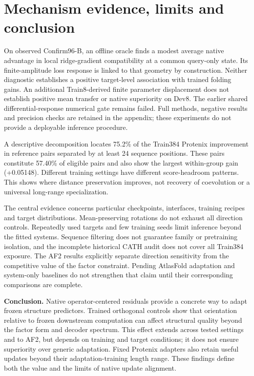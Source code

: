 \section{Mechanism evidence, limits and conclusion}
\label{sec:7}
On observed Confirm96-B, an offline oracle finds a modest average native
advantage in local ridge-gradient compatibility at a common query-only state.
Its finite-amplitude loss response is linked to that geometry by construction.
Neither diagnostic establishes a positive target-level association with trained
folding gains. An additional Train8-derived finite parameter displacement does
not establish positive mean transfer or native superiority on Dev8. The earlier
shared differential-response numerical gate remains failed. Full methods,
negative results and precision checks are retained in the appendix; these
experiments do not provide a deployable inference procedure.

A descriptive decomposition locates 75.2\% of the Train384 Protenix improvement
in reference pairs separated by at least 24 sequence positions. These pairs
constitute 57.40\% of eligible pairs and also show the largest within-group gain
(+0.05148). Different training settings have different score-headroom patterns.
This shows where distance preservation improves, not recovery of coevolution
or a universal long-range specialization.

The central evidence concerns particular checkpoints, interfaces, training
recipes and target distributions. Mean-preserving rotations do not exhaust
all direction controls. Repeatedly used targets and few training seeds limit
inference beyond the fitted systems. Sequence filtering does not guarantee
family or pretraining isolation, and the incomplete historical CATH audit does
not cover all Train384 exposure. The AF2 results explicitly separate direction
sensitivity from the competitive value of the factor constraint. Pending
AtlasFold adaptation and system-only baselines do not strengthen that claim
until their corresponding comparisons are complete.

\textbf{Conclusion.} Native operator-centered residuals provide a concrete way to
adapt frozen structure predictors. Trained orthogonal controls show that
orientation relative to frozen downstream computation can affect structural
quality beyond the factor form and decoder spectrum. This effect extends
across tested settings and to AF2, but depends on training and target conditions;
it does not ensure superiority over generic adaptation. Fixed Protenix adapters
also retain useful updates beyond their adaptation-training length range.
These findings define both the value and the limits of native update alignment.
